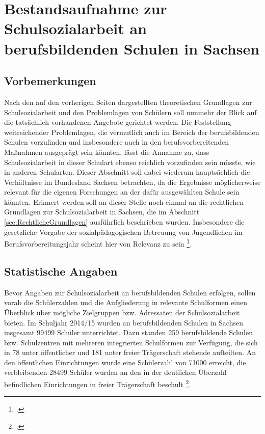 \section[Bestandsaufnahme zur Schulsozialarbeit]{Bestandsaufnahme zur Schulsozialarbeit an berufsbildenden Schulen in Sachsen}
\label{sec:BestandsaufnahmeZurSchulsozialarbeitAnBerufsbildendenSchulenInSachsen}

\subsection{Vorbemerkungen}
\label{sec:Vorbemerkungen}

Nach den auf den vorherigen Seiten dargestellten theoretischen Grundlagen zur Schulsozialarbeit und den Problemlagen von Schülern soll nunmehr der Blick auf die tatsächlich vorhandenen Angebote gerichtet werden. Die Feststellung weitreichender Problemlagen, die vermutlich auch im Bereich der berufsbildenden Schulen vorzufinden und insbesondere auch in den berufsvorbereitenden Maßnahmen ausgeprägt sein könnten, lässt die Annahme zu, dass Schulsozialarbeit in dieser Schulart ebenso reichlich vorzufinden sein müsste, wie in anderen Schularten. Dieser Abschnitt soll dabei wiederum hauptsächlich die Verhältnisse im Bundesland Sachsen betrachten, da die Ergebnisse möglicherweise relevant für die eigenen Forschungen an der dafür ausgewählten Schule sein könnten. Erinnert werden soll an dieser Stelle noch einmal an die rechtlichen Grundlagen zur Schulsozialarbeit in Sachsen, die im Abschnitt \ref{sec:RechtlicheGrundlagen} ausführlich beschrieben wurden. Insbesondere die gesetzliche Vorgabe der sozialpädagogischen Betreuung von Jugendlichen im Berufsvorbereitungsjahr scheint hier von Relevanz zu sein \footcite[vgl.][7]{SMKSK2010}.

\subsection{Statistische Angaben}
\label{sec:StatistischeAngaben}

Bevor Angaben zur Schulsozialarbeit an berufsbildenden Schulen erfolgen, sollen vorab die Schülerzahlen und die Aufgliederung in relevante Schulformen einen Überblick über mögliche Zielgruppen bzw. Adressaten der Schulsozialarbeit bieten. Im Schuljahr 2014/15 wurden an berufsbildenden Schulen in Sachsen insgesamt 99499 Schüler unterrichtet. Dazu standen 259 berufsbildende Schulen bzw. Schulzentren mit mehreren integrierten Schulformen zur Verfügung, die sich in 78 unter öffentlicher und 181 unter freier Trägerschaft stehende aufteilten. An den öffentlichen Einrichtungen wurde eine Schülerzahl von 71000 erreicht, die verbleibenden 28499 Schüler wurden an den in der deutlichen Überzahl befindlichen Einrichtungen in freier Trägerschaft beschult \footcite[vgl.][10ff]{SLFS2015}.

